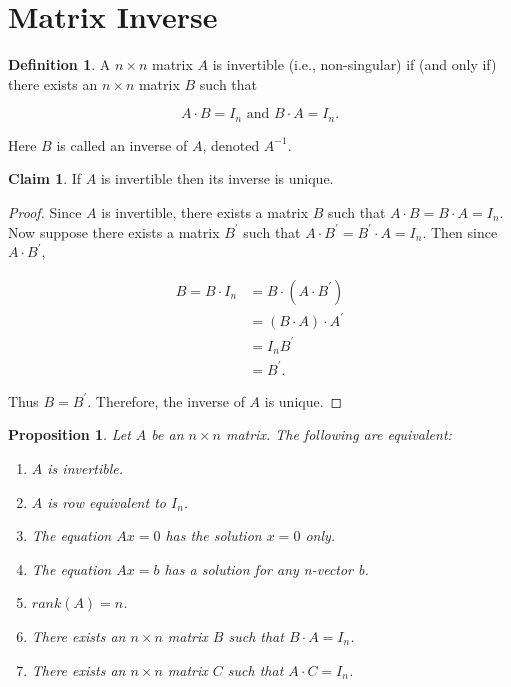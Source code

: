 \documentclass[12pt]{article}
\newtheorem*{proposition}{Proposition}
\theoremstyle{definition}
\newtheorem*{definition}{Definition}
\newtheorem*{claim}{Claim}
\begin{document}
\section{Matrix Inverse}

\begin{definition}
A $n \times n$ matrix $A$ is invertible (i.e., non-singular) if (and only if) there exists
an $n \times n$ matrix $B$ such that

$$ A \cdot B = I_n \text{ and } B \cdot A = I_n.$$

Here $B$ is called an inverse of $A$, denoted $A^{-1}$.
\end{definition}

\begin{claim}
If $A$ is invertible then its inverse is unique.
\end{claim}

\begin{proof}
Since $A$ is invertible, there exists a matrix $B$ such that $A \cdot B = B \cdot A = I_n$. Now
suppose there exists a matrix $B^{\prime}$ such that $A \cdot B^{\prime} = B^{\prime} \cdot A = I_n$.
Then since $A \cdot B^{\prime}$,

\begin{align*}
B = B \cdot I_n &= B \cdot (A \cdot B^{\prime}) \\
&= (B \cdot A) \cdot A^{\prime} \\
&= I_n B^{\prime} \\
&= B^{\prime}.
\end{align*}

Thus $B = B^{\prime}$. Therefore, the inverse of $A$ is unique.
\end{proof}

\begin{proposition}
Let $A$ be an $n \times n$ matrix. The following are equivalent:
\begin{enumerate}[label = (\arabic*)]
\addtocounter{enumi}{-1}

\item $A$ is invertible.

\item $A$ is row equivalent to $I_n$.

\item The equation $Ax = 0$ has the solution $x = 0$ only.

\item The equation $Ax = b$ has a solution for any n-vector b.

\item $rank(A) = n$.

\item There exists an $n \times n$ matrix $B$ such that $B \cdot A = I_n$.

\item There exists an $n \times n$ matrix $C$ such that $A \cdot C = I_n$.
\end{enumerate}

\end{proposition}
\end{document}
